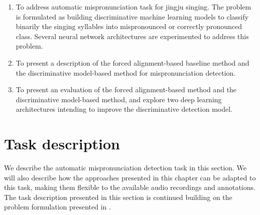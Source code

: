 \begin{enumerate}[leftmargin=*]
\item To address automatic mispronunciation task for jingju singing. The problem is formulated as building discriminative machine learning models to classify binarily the singing syllables into mispronounced or correctly pronounced class. Several neural network architectures are experimented to address this problem.
\item To present a description of the forced alignment-based baseline method and the discriminative model-based method for mispronunciation detection.
\item To present an evaluation of the forced alignment-based method and the discriminative model-based method, and explore two deep learning architectures intending to improve the discriminative detection model. 
\end{enumerate}

\section{Task description}

We describe the automatic mispronunciation detection task in this section. We will also describe how the approaches presented in this chapter can be adapted to this task, making them flexible to the available audio recordings and annotations. The task description presented in this section is continued building on the problem formulation presented in .

